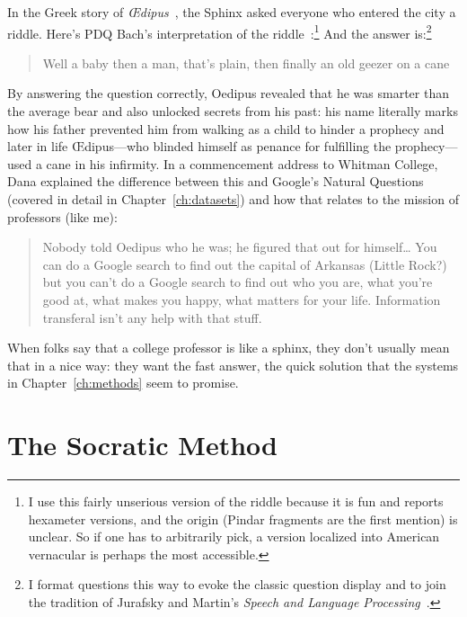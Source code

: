 In the Greek story of \textit{\OE{}dipus}~\citep{sophocles-59}, the Sphinx asked everyone who entered the city a riddle.  Here’s PDQ Bach’s interpretation of the riddle~\citep{schickele-90}:\footnote{I use this fairly unserious version of the riddle because it is fun and \citet{renger-13} reports hexameter versions, and the origin (Pindar fragments are the first mention) is unclear.  So if one has to arbitrarily pick, a version localized into American vernacular is perhaps the most accessible.}
And the answer is:\footnote{I format questions this way to evoke
the classic \jeopardy{} question display and to join the tradition of
Jurafsky and Martin's \textit{Speech and Language Processing}~\citep{jurafsky-24}.}
\begin{quote}
Well a baby then a man, that’s plain,
then finally an old geezer on a cane
\end{quote}

By answering the question correctly, Oedipus revealed that he was smarter than the average bear and also unlocked secrets from his past: his name literally marks how his father prevented him from walking as a child to hinder a prophecy and later in life \OE{}dipus---who blinded himself as penance for fulfilling the prophecy---used a cane in his infirmity.
%
In a commencement address to Whitman College, Dana \citet{burgess-13} explained the difference between this and Google’s Natural Questions (covered in detail in Chapter~\ref{ch:datasets}) and how that relates to the mission of professors (like me):
\begin{quote}
Nobody told Oedipus who he was;
%
he figured that out for himself\dots
%
You can do a Google search to find out the capital of Arkansas (Little Rock?) but you can’t do a Google search to find out who you are,
%
what you’re good at, what makes you happy, what matters for your life.
%
Information transferal isn’t any help with that stuff.
\end{quote}
When folks say that a college professor is like a sphinx,
%
they don’t usually mean that in a nice way: they want the fast answer, the quick solution that the  systems in Chapter~\ref{ch:methods} seem to promise.

\section{The Socratic Method}
\label{sec:civilization:socratic}

